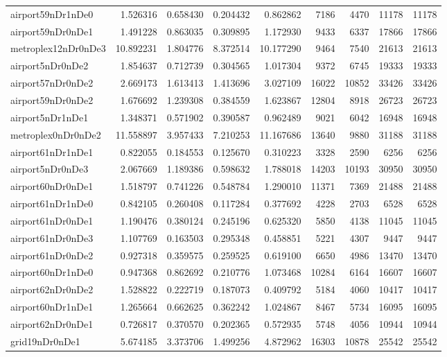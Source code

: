 \begin{longtable}{|l|r|r|r|r|r|r|r|r|}
airport59nDr1nDe0 & 1.526316 & 0.658430 & 0.204432 & 0.862862 & 7186 & 4470 & 11178 & 11178 \\
airport59nDr0nDe1 & 1.491228 & 0.863035 & 0.309895 & 1.172930 & 9433 & 6337 & 17866 & 17866 \\
metroplex12nDr0nDe3 & 10.892231 & 1.804776 & 8.372514 & 10.177290 & 9464 & 7540 & 21613 & 21613 \\
airport5nDr0nDe2 & 1.854637 & 0.712739 & 0.304565 & 1.017304 & 9372 & 6745 & 19333 & 19333 \\
airport57nDr0nDe2 & 2.669173 & 1.613413 & 1.413696 & 3.027109 & 16022 & 10852 & 33426 & 33426 \\
airport59nDr0nDe2 & 1.676692 & 1.239308 & 0.384559 & 1.623867 & 12804 & 8918 & 26723 & 26723 \\
airport5nDr1nDe1 & 1.348371 & 0.571902 & 0.390587 & 0.962489 & 9021 & 6042 & 16948 & 16948 \\
metroplex0nDr0nDe2 & 11.558897 & 3.957433 & 7.210253 & 11.167686 & 13640 & 9880 & 31188 & 31188 \\
airport61nDr1nDe1 & 0.822055 & 0.184553 & 0.125670 & 0.310223 & 3328 & 2590 & 6256 & 6256 \\
airport5nDr0nDe3 & 2.067669 & 1.189386 & 0.598632 & 1.788018 & 14203 & 10193 & 30950 & 30950 \\
airport60nDr0nDe1 & 1.518797 & 0.741226 & 0.548784 & 1.290010 & 11371 & 7369 & 21488 & 21488 \\
airport61nDr1nDe0 & 0.842105 & 0.260408 & 0.117284 & 0.377692 & 4228 & 2703 & 6528 & 6528 \\
airport61nDr0nDe1 & 1.190476 & 0.380124 & 0.245196 & 0.625320 & 5850 & 4138 & 11045 & 11045 \\
airport61nDr0nDe3 & 1.107769 & 0.163503 & 0.295348 & 0.458851 & 5221 & 4307 & 9447 & 9447 \\
airport61nDr0nDe2 & 0.927318 & 0.359575 & 0.259525 & 0.619100 & 6650 & 4986 & 13470 & 13470 \\
airport60nDr1nDe0 & 0.947368 & 0.862692 & 0.210776 & 1.073468 & 10284 & 6164 & 16607 & 16607 \\
airport62nDr0nDe2 & 1.528822 & 0.222719 & 0.187073 & 0.409792 & 5184 & 4060 & 10417 & 10417 \\
airport60nDr1nDe1 & 1.265664 & 0.662625 & 0.362242 & 1.024867 & 8467 & 5734 & 16095 & 16095 \\
airport62nDr0nDe1 & 0.726817 & 0.370570 & 0.202365 & 0.572935 & 5748 & 4056 & 10944 & 10944 \\
grid19nDr0nDe1 & 5.674185 & 3.373706 & 1.499256 & 4.872962 & 16303 & 10878 & 25542 & 25542 \\

\end{longtable}
